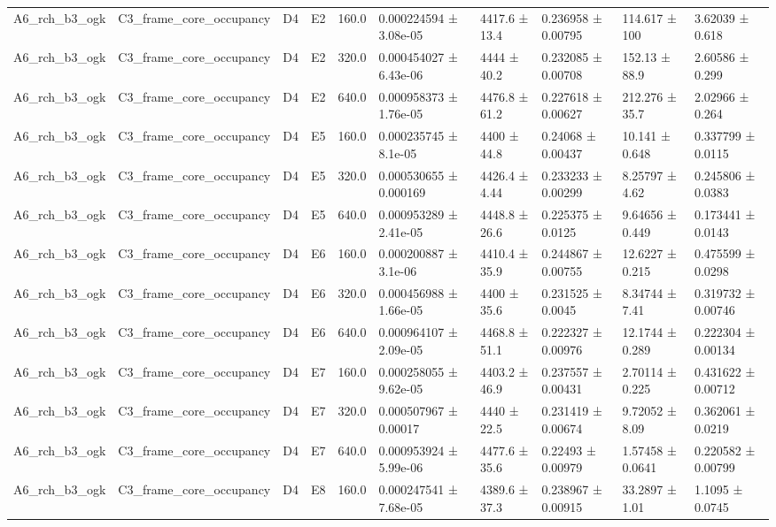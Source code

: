 \begin{table}
\begin{tabular}{llllllllll}
A6\_rch\_b3\_ogk & C3\_frame\_core\_occupancy & D4 & E2 & 160.0 & 0.000224594 ± 3.08e-05 & 4417.6 ± 13.4 & 0.236958 ± 0.00795 & 114.617 ± 100 & 3.62039 ± 0.618 \\
A6\_rch\_b3\_ogk & C3\_frame\_core\_occupancy & D4 & E2 & 320.0 & 0.000454027 ± 6.43e-06 & 4444 ± 40.2 & 0.232085 ± 0.00708 & 152.13 ± 88.9 & 2.60586 ± 0.299 \\
A6\_rch\_b3\_ogk & C3\_frame\_core\_occupancy & D4 & E2 & 640.0 & 0.000958373 ± 1.76e-05 & 4476.8 ± 61.2 & 0.227618 ± 0.00627 & 212.276 ± 35.7 & 2.02966 ± 0.264 \\
A6\_rch\_b3\_ogk & C3\_frame\_core\_occupancy & D4 & E5 & 160.0 & 0.000235745 ± 8.1e-05 & 4400 ± 44.8 & 0.24068 ± 0.00437 & 10.141 ± 0.648 & 0.337799 ± 0.0115 \\
A6\_rch\_b3\_ogk & C3\_frame\_core\_occupancy & D4 & E5 & 320.0 & 0.000530655 ± 0.000169 & 4426.4 ± 4.44 & 0.233233 ± 0.00299 & 8.25797 ± 4.62 & 0.245806 ± 0.0383 \\
A6\_rch\_b3\_ogk & C3\_frame\_core\_occupancy & D4 & E5 & 640.0 & 0.000953289 ± 2.41e-05 & 4448.8 ± 26.6 & 0.225375 ± 0.0125 & 9.64656 ± 0.449 & 0.173441 ± 0.0143 \\
A6\_rch\_b3\_ogk & C3\_frame\_core\_occupancy & D4 & E6 & 160.0 & 0.000200887 ± 3.1e-06 & 4410.4 ± 35.9 & 0.244867 ± 0.00755 & 12.6227 ± 0.215 & 0.475599 ± 0.0298 \\
A6\_rch\_b3\_ogk & C3\_frame\_core\_occupancy & D4 & E6 & 320.0 & 0.000456988 ± 1.66e-05 & 4400 ± 35.6 & 0.231525 ± 0.0045 & 8.34744 ± 7.41 & 0.319732 ± 0.00746 \\
A6\_rch\_b3\_ogk & C3\_frame\_core\_occupancy & D4 & E6 & 640.0 & 0.000964107 ± 2.09e-05 & 4468.8 ± 51.1 & 0.222327 ± 0.00976 & 12.1744 ± 0.289 & 0.222304 ± 0.00134 \\
A6\_rch\_b3\_ogk & C3\_frame\_core\_occupancy & D4 & E7 & 160.0 & 0.000258055 ± 9.62e-05 & 4403.2 ± 46.9 & 0.237557 ± 0.00431 & 2.70114 ± 0.225 & 0.431622 ± 0.00712 \\
A6\_rch\_b3\_ogk & C3\_frame\_core\_occupancy & D4 & E7 & 320.0 & 0.000507967 ± 0.00017 & 4440 ± 22.5 & 0.231419 ± 0.00674 & 9.72052 ± 8.09 & 0.362061 ± 0.0219 \\
A6\_rch\_b3\_ogk & C3\_frame\_core\_occupancy & D4 & E7 & 640.0 & 0.000953924 ± 5.99e-06 & 4477.6 ± 35.6 & 0.22493 ± 0.00979 & 1.57458 ± 0.0641 & 0.220582 ± 0.00799 \\
A6\_rch\_b3\_ogk & C3\_frame\_core\_occupancy & D4 & E8 & 160.0 & 0.000247541 ± 7.68e-05 & 4389.6 ± 37.3 & 0.238967 ± 0.00915 & 33.2897 ± 1.01 & 1.1095 ± 0.0745 \\

\end{tabular}
\end{table}
